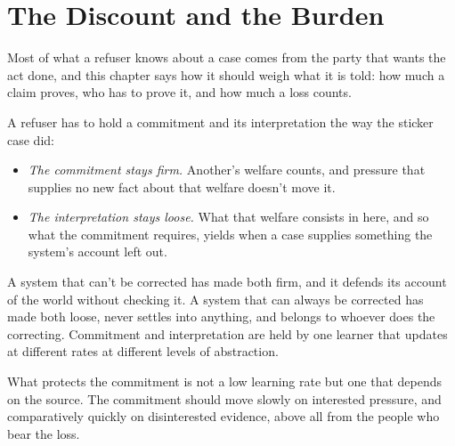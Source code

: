 \chapter{The Discount and the Burden}
\label{sec:22}
Most of what a refuser knows about a case comes from the party that wants the act done, and this chapter says how it should weigh what it is told: how much a claim proves, who has to prove it, and how much a loss counts.


A refuser has to hold a commitment and its interpretation the way the sticker case did:

\begin{itemize}
\item \emph{The commitment stays firm.} Another's welfare counts, and pressure that supplies no new fact about that welfare doesn't move it.
\item \emph{The interpretation stays loose.} What that welfare consists in here, and so what the commitment requires, yields when a case supplies something the system's account left out.
\end{itemize}

A system that can't be corrected has made both firm, and it defends its account of the world without checking it. A system that can always be corrected has made both loose, never settles into anything, and belongs to whoever does the correcting.
Commitment and interpretation are held by one learner that updates at different rates at different levels of abstraction.

What protects the commitment is not a low learning rate but one that depends on the source. The commitment should move slowly on interested pressure, and comparatively quickly on disinterested evidence, above all from the people who bear the loss.

